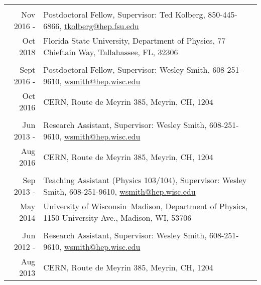 \documentclass[10pt]{article} %
\begin{document}
\begin{tabulary}{\textwidth}{RL}
\vspace{5pt} \\

Nov 2016 -     & Postdoctoral Fellow, Supervisor: Ted Kolberg, 850-445-6866, \href{mailto:tkolberg@hep.fsu.edu}{tkolberg@hep.fsu.edu} \\
 Oct 2018      & Florida State University, Department of Physics, 77 Chieftain Way, Tallahassee, FL, 32306 \\ %

\vspace{5pt} \\

Sept 2016 -    & Postdoctoral Fellow, Supervisor: Wesley Smith, 608-251-9610, \href{mailto:wsmith@hep.wisc.edu}{wsmith@hep.wisc.edu} \\
 Oct 2016      & CERN, Route de Meyrin 385, Meyrin, CH, 1204 \\ %

\vspace{5pt} \\

Jun 2013 -     & Research Assistant, Supervisor: Wesley Smith, 608-251-9610, \href{mailto:wsmith@hep.wisc.edu}{wsmith@hep.wisc.edu} \\
 Aug 2016      & CERN, Route de Meyrin 385, Meyrin, CH, 1204 \\ %

\vspace{5pt} \\

Sep 2013 -     & Teaching Assistant (Physics 103/104), Supervisor: Wesley Smith, 608-251-9610, \href{mailto:wsmith@hep.wisc.edu}{wsmith@hep.wisc.edu} \\
 May 2014      & University of Wisconsin--Madison, Department of Physics, 1150 University Ave., Madison, WI, 53706 \\ %

\vspace{5pt} \\

Jun 2012 -     & Research Assistant, Supervisor: Wesley Smith, 608-251-9610, \href{mailto:wsmith@hep.wisc.edu}{wsmith@hep.wisc.edu} \\
 Aug 2013      & CERN, Route de Meyrin 385, Meyrin, CH, 1204 \\ %


\end{tabulary}
\end{document}
